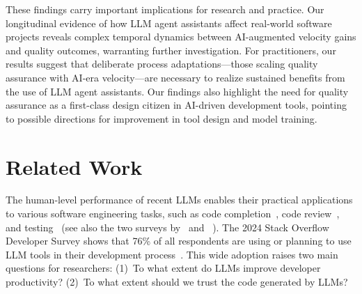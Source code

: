 These findings carry important implications for research and practice.
Our longitudinal evidence of how LLM agent assistants affect real-world software projects reveals complex temporal dynamics between AI-augmented velocity gains and quality outcomes, warranting further investigation.
For practitioners, our results suggest that deliberate process adaptations---those scaling quality assurance with AI-era velocity---are necessary to realize sustained benefits from the use of LLM agent assistants.
Our findings also highlight the need for quality assurance as a first-class design citizen in AI-driven development tools, pointing to possible directions for improvement in tool design and model training.

\section{Related Work}

\label{sec:llm-impact}

The human-level performance of recent LLMs enables their practical applications to various software engineering tasks, such as code completion~\cite{DBLP:journals/csi/HuseinAC25}, code review~\cite{DBLP:conf/issre/LuYLYZ23}, and testing~\cite{DBLP:journals/tse/SchaferNET24} (see also the two surveys by~\citet{DBLP:conf/fose-ws/FanGHLSYZ23} and ~\citet{DBLP:journals/tosem/HouZLYWLLLGW24}).
The 2024 Stack Overflow Developer Survey shows that 76\% of all respondents are using or planning to use LLM tools in their development process~\cite{stackoverflow-survey-ai}.
This wide adoption raises two main questions for researchers: (1)~To what extent do LLMs improve developer productivity? (2)~To what extent should we trust the code generated by LLMs?

